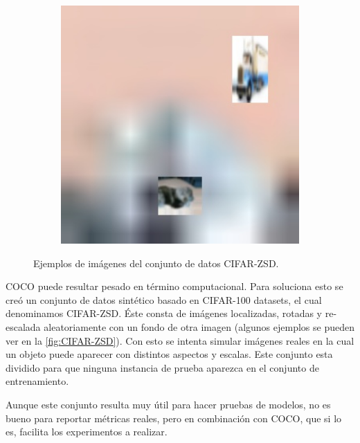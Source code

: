 \begin{figure}[H]
\begin{center}
\begin{subfigure}{.3\textwidth}
			\label{fig:ex2}
		\end{subfigure}
		\begin{subfigure}{.3\textwidth}
			\includegraphics[width=1\textwidth]{img/cifar-zsd-test283.jpg}
			\label{fig:ex3}
		\end{subfigure}
		\caption{Ejemplos de imágenes del conjunto de datos CIFAR-ZSD.}
		\label{fig:CIFAR-ZSD}
	\end{center}
\end{figure}

COCO puede resultar pesado en término computacional. Para soluciona esto se creó un conjunto de datos sintético basado en CIFAR-100 datasets, el cual denominamos CIFAR-ZSD. Éste consta de imágenes localizadas, rotadas y re-escalada aleatoriamente con un fondo de otra imagen (algunos ejemplos se pueden ver en la \autoref{fig:CIFAR-ZSD}). Con esto se intenta simular imágenes reales en la cual un objeto puede aparecer con distintos aspectos y escalas. Este conjunto esta dividido para que ninguna instancia de prueba  aparezca en el conjunto de entrenamiento.

Aunque este conjunto resulta muy útil para hacer pruebas de modelos, no es bueno para reportar métricas reales, pero en combinación con COCO, que si lo es, facilita los experimentos a realizar.


